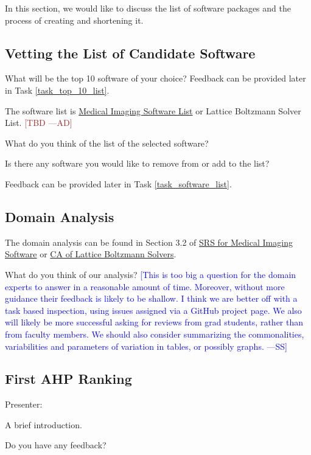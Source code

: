 \documentclass[12pt]{article}
\newcommand{\authornote}[3]{\textcolor{#1}{[#3 ---#2]}}
\newcommand{\authornote}[3]{}
\newcommand{\wss}[1]{\authornote{blue}{SS}{#1}} %
\newcommand{\ad}[1]{\authornote{brown}{AD}{#1}} %
\begin{document}
In this section, we would like to discuss the list of software packages and the
process of creating and shortening it.

\subsection{Vetting the List of Candidate Software}
\label{vetting_list}
What will be the top 10 software of your choice? Feedback can be provided later
in Task \ref{task_top_10_list}.

The software list is
\href{https://docs.google.com/spreadsheets/d/122wU0v3ZtvDcqy8C4zKJ89kU-8fXAbo3Mzn6vcVXOi0/edit?usp=sharing}{Medical
	Imaging Software List} or Lattice Boltzmann Solver List. \ad{TBD}

What do you think of the list of the selected software?

Is there any software you would like to remove from or add to the list?

Feedback can be provided later in Task \ref{task_software_list}.

\subsection{Domain Analysis}
\label{domain_analysis}
The domain analysis can be found in Section 3.2 of
\href{https://github.com/Ao99/MISEG/blob/master/docs/SRS/SRS.pdf}{SRS for
Medical Imaging Software} or
\href{https://github.com/peter-michalski/LatticeBoltzmannSolvers/blob/master/docs/SRS/CA.pdf}{CA
of Lattice Boltzmann Solvers}.

What do you think of our analysis?  \wss{This is too big a question for the
  domain experts to answer in a reasonable amount of time.  Moreover, without
  more guidance their feedback is likely to be shallow.  I think we are better
  off with a task based inspection, using issues assigned via a GitHub project
  page.  We also will likely be more successful asking for reviews from grad
  students, rather than from faculty members.  We should also consider
  summarizing the commonalities, variabilities and parameters of variation in
  tables, or possibly graphs.}

\subsection{First AHP Ranking}
\label{first_AHP}
Presenter:

A brief introduction. 

Do you have any feedback?
\end{document}
